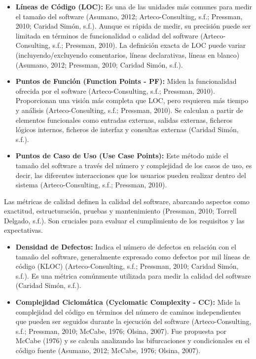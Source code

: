 \documentclass[11pt]{article}
\begin{document}
\begin{itemize}
    \item \textbf{Líneas de Código (LOC):} Es una de las unidades más comunes para medir el tamaño del software (Asumano, 2012; Arteco-Consulting, s.f.; Pressman, 2010; Caridad Simón, s.f.). Aunque es rápida de medir, su precisión puede ser limitada en términos de funcionalidad o calidad del software (Arteco-Consulting, s.f.; Pressman, 2010). La definición exacta de LOC puede variar (incluyendo/excluyendo comentarios, líneas declarativas, líneas en blanco) (Asumano, 2012; Pressman, 2010; Caridad Simón, s.f.).
    \item \textbf{Puntos de Función (Function Points - PF):} Miden la funcionalidad ofrecida por el software (Arteco-Consulting, s.f.; Pressman, 2010). Proporcionan una visión más completa que LOC, pero requieren más tiempo y análisis (Arteco-Consulting, s.f.; Pressman, 2010). Se calculan a partir de elementos funcionales como entradas externas, salidas externas, ficheros lógicos internos, ficheros de interfaz y consultas externas (Caridad Simón, s.f.).
    \item \textbf{Puntos de Caso de Uso (Use Case Points):} Este método mide el tamaño del software a través del número y complejidad de los casos de uso, es decir, las diferentes interacciones que los usuarios pueden realizar dentro del sistema (Arteco-Consulting, s.f.; Pressman, 2010).
\end{itemize}

Las métricas de calidad definen la calidad del software, abarcando aspectos como exactitud, estructuración, pruebas y mantenimiento (Pressman, 2010; Torrell Delgado, s.f.). Son cruciales para evaluar el cumplimiento de los requisitos y las expectativas.

\begin{itemize}
    \item \textbf{Densidad de Defectos:} Indica el número de defectos en relación con el tamaño del software, generalmente expresado como defectos por mil líneas de código (KLOC) (Arteco-Consulting, s.f.; Pressman, 2010; Caridad Simón, s.f.). Es una métrica comúnmente utilizada para medir la calidad del software (Caridad Simón, s.f.).
    \item \textbf{Complejidad Ciclomática (Cyclomatic Complexity - CC):} Mide la complejidad del código en términos del número de caminos independientes que pueden ser seguidos durante la ejecución del software (Arteco-Consulting, s.f.; Pressman, 2010; McCabe, 1976; Olsina, 2007). Fue propuesta por McCabe (1976) y se calcula analizando las bifurcaciones y condicionales en el código fuente (Asumano, 2012; McCabe, 1976; Olsina, 2007).
\end{itemize}
\end{document}
